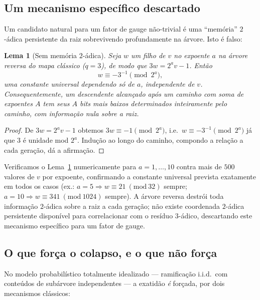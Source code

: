 \documentclass[11pt]{article}
\newtheorem{lemma}[theorem]{Lema}
\theoremstyle{definition}
\theoremstyle{remark}
\begin{document}
\subsection{Um mecanismo específico descartado}

Um candidato natural para um fator de gauge não-trivial é uma
``memória'' $2$-ádica persistente da raiz sobrevivendo profundamente
na árvore. Isto é falso:

\begin{lemma}[Sem memória $2$-ádica]\label{lem:2adic}
Seja $w$ um filho de $v$ no expoente $a$ na árvore reversa do mapa
clássico ($q=3$), de modo que $3w=2^a v - 1$. Então
\[
  w \equiv -3^{-1} \pmod{2^a},
\]
uma constante universal dependendo só de $a$, independente de $v$.
Consequentemente, um descendente alcançado após um caminho com soma de
expoentes $A$ tem seus $A$ bits mais baixos determinados
\emph{inteiramente pelo caminho}, com informação nula sobre a raiz.
\end{lemma}

\begin{proof}
De $3w=2^av-1$ obtemos $3w\equiv -1\pmod{2^a}$, i.e.\ $w\equiv
-3^{-1}\pmod{2^a}$ já que $3$ é unidade mod $2^a$. Indução ao longo do
caminho, compondo a relação a cada geração, dá a afirmação.
\end{proof}

Verificamos o Lema~\ref{lem:2adic} numericamente para $a=1,\dots,10$
contra mais de $500$ valores de $v$ por expoente, confirmando a
constante universal prevista exatamente em todos os casos (ex.:
$a=5\Rightarrow w\equiv 21\ (\mathrm{mod}\ 32)$ sempre; $a=10\Rightarrow
w\equiv 341\ (\mathrm{mod}\ 1024)$ sempre). A árvore reversa destrói
toda informação $2$-ádica sobre a raiz a cada geração; não existe
coordenada $2$-ádica persistente disponível para correlacionar com o
resíduo $3$-ádico, descartando este mecanismo específico para um fator
de gauge.

\subsection{O que força o colapso, e o que não força}

No modelo probabilístico totalmente idealizado --- ramificação i.i.d.\
com conteúdos de subárvore independentes --- a exatidão \emph{é}
forçada, por dois mecanismos clássicos:
\end{document}
